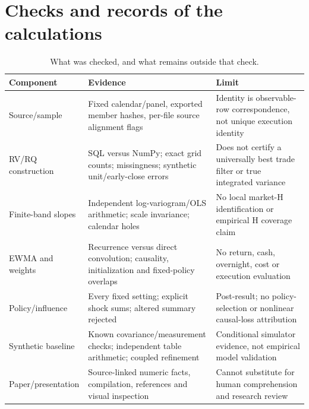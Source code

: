 \documentclass[11pt,a4paper]{article}
\begin{document}
\section{Checks and records of the calculations}\label{app:audit}
\begin{table}[htbp]\centering\small
\caption{What was checked, and what remains outside that check.}
\begin{tabular}{p{.19\linewidth}p{.43\linewidth}p{.29\linewidth}}
\toprule Component & Evidence & Limit\\\midrule
Source/sample & Fixed calendar/panel, exported member hashes, per-file source alignment flags & Identity is observable-row correspondence, not unique execution identity\\
RV/RQ construction & SQL versus NumPy; exact grid counts; missingness; synthetic unit/early-close errors & Does not certify a universally best trade filter or true integrated variance\\
Finite-band slopes & Independent log-variogram/OLS arithmetic; scale invariance; calendar holes & No local market-H identification or empirical H coverage claim\\
EWMA and weights & Recurrence versus direct convolution; causality, initialization and fixed-policy overlaps & No return, cash, overnight, cost or execution evaluation\\
Policy/influence & Every fixed setting; explicit shock sums; altered summary rejected & Post-result; no policy-selection or nonlinear causal-loss attribution\\
Synthetic baseline & Known covariance/measurement checks; independent table arithmetic; coupled refinement & Conditional simulator evidence, not empirical model validation\\
Paper/presentation & Source-linked numeric facts, compilation, references and visual inspection & Cannot substitute for human comprehension and research review\\
\bottomrule\end{tabular}
\end{table}
\end{document}
